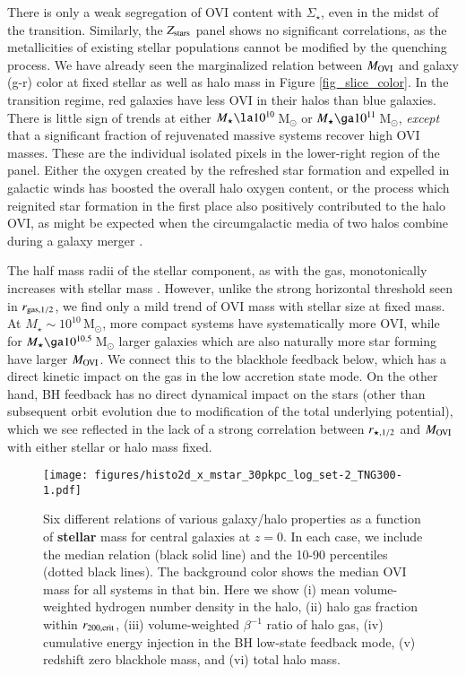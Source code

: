 \documentclass[useAMS,usenatbib]{mnras}
\newcommand{\msun}{\,M$_{\odot}$\xspace}
\newcommand{\ovi}{OVI\xspace}
\begin{document}
There is only a weak segregation of \ovi content with $\Sigma_\star$, even in the midst of the transition.
Similarly, the $Z_{\rm stars}$ panel shows no significant correlations, as the metallicities of existing stellar populations cannot be modified by the quenching process.
We have already seen the marginalized relation between $M_{\rm OVI}$ and galaxy \mbox{(g-r)} color at fixed stellar as well as halo mass in Figure \ref{fig_slice_color}. In the transition regime, red galaxies have less \ovi in their halos than blue galaxies. There is little sign of trends at either $M_\star \la 10^{10}$\msun or $M_\star \ga 10^{11}$\msun, \textit{except} that a significant fraction of rejuvenated massive systems recover high \ovi masses. These are the individual isolated pixels in the lower-right region of the panel. Either the oxygen created by the refreshed star formation and expelled in galactic winds has boosted the overall halo oxygen content, or the process which reignited star formation in the first place also positively contributed to the halo \ovi, as might be expected when the circumgalactic media of two halos combine during a galaxy merger \citep[e.g.][]{hani18}.

The half mass radii of the stellar component, as with the gas, monotonically increases with stellar mass \citep[see ][for the size-mass relation in TNG]{genel18}. However, unlike the strong horizontal threshold seen in $r_{\rm gas, 1/2}$, we find only a mild trend of \ovi mass with stellar size at fixed mass. At $M_\star \sim 10^{10}$\msun, more compact systems have systematically more \ovi, while for $M_\star \ga 10^{10.5}$\msun larger galaxies which are also naturally more star forming have larger $M_{\rm OVI}$. We connect this to the blackhole feedback below, which has a direct kinetic impact on the gas in the low accretion state mode. On the other hand, BH feedback has no direct dynamical impact on the stars (other than subsequent orbit evolution due to modification of the total underlying potential), which we see reflected in the lack of a strong correlation between $r_{\rm \star,1/2}$ and $M_{\rm OVI}$ with either stellar or halo mass fixed.

\begin{figure*}
\centerline{\texttt{[image: figures/histo2d\_x\_mstar\_30pkpc\_log\_set-2\_TNG300-1.pdf]}}
\caption{ Six different relations of various galaxy/halo properties as a function of \textbf{stellar} mass for central galaxies at $z=0$. 
In each case, we include the median relation (black solid line) and the 10-90 percentiles (dotted black lines). The background 
color shows the median \ovi mass for all systems in that bin. Here we show
(i) mean volume-weighted hydrogen number density in the halo,
(ii) halo gas fraction within $r_{\rm 200,crit}$,
(iii) volume-weighted $\beta^{-1}$ ratio of halo gas,
(iv) cumulative energy injection in the BH low-state feedback mode,
(v) redshift zero blackhole mass,
and (vi) total halo mass.
 \label{fig_hist2d_mstar_3}} 
\end{figure*}
\end{document}
